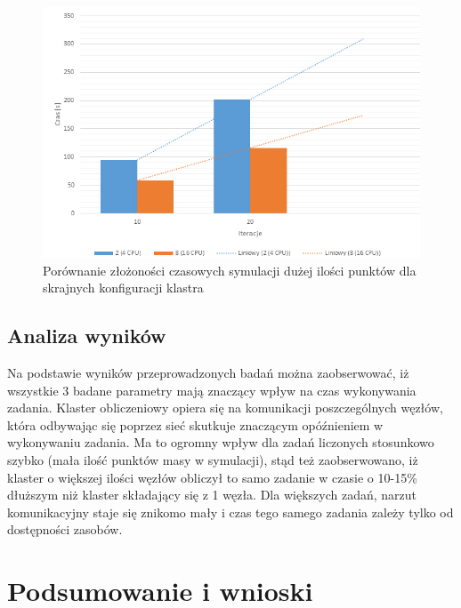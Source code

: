 \documentclass[a4paper,onecolumn,oneside,12pt]{memoir}
\begin{document}
{{\begin{figure}[h!]
	\centering
	\includegraphics[width=1\linewidth]{wykres-3}
	\caption{Porównanie złożoności czasowych symulacji dużej ilości punktów dla skrajnych konfiguracji klastra}
	\label{fig:stronaTytulowa}
\end{figure}

\vspace*{1mm}
\section{Analiza wyników}
Na podstawie wyników przeprowadzonych badań można zaobserwować, iż wszystkie 3 badane parametry mają znaczący wpływ na czas wykonywania zadania.
Klaster obliczeniowy opiera się na komunikacji poszczególnych węzłów, która odbywając się poprzez sieć skutkuje znaczącym opóźnieniem w wykonywaniu zadania. Ma to ogromny wpływ dla zadań liczonych stosunkowo szybko (mała ilość punktów masy w symulacji), stąd też zaobserwowano, iż klaster o większej ilości węzłów obliczył to samo zadanie w czasie o 10-15\% dłuższym niż klaster składający się z 1 węzła. Dla większych zadań, narzut komunikacyjny staje się znikomo mały i czas tego samego zadania zależy tylko od dostępności zasobów.

\chapter{Podsumowanie i wnioski}

\mbox{}
\listoffigures*

\begin{flushleft}


\end{flushleft}}}
\end{document}
